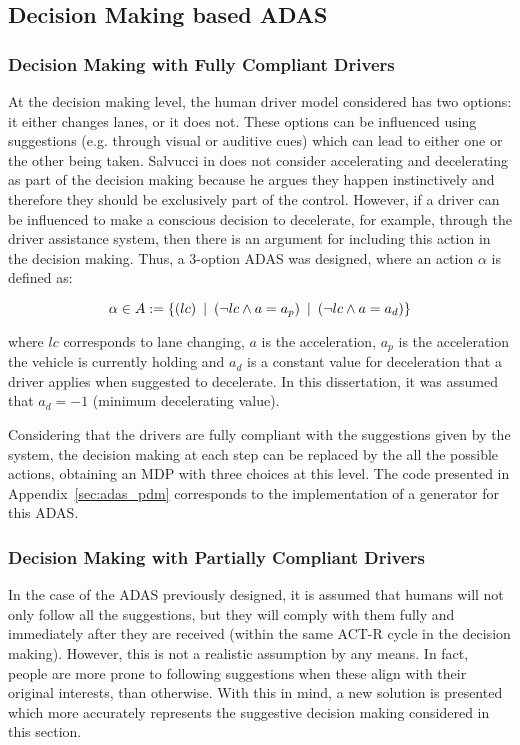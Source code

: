 \subsection{Decision Making based ADAS}

\subsubsection{Decision Making with Fully Compliant Drivers}

At the decision making level, the human driver model considered has two options: it either changes lanes, or it does not. These options can be influenced using suggestions (e.g. through visual or auditive cues) which can lead to either one or the other being taken. Salvucci in \cite{salvucci_1} does not consider accelerating and decelerating as part of the decision making because he argues they happen instinctively and therefore they should be exclusively part of the control. However, if a driver can be influenced to make a conscious decision to decelerate, for example, through the driver assistance system, then there is an argument for including this action in the decision making. Thus, a 3-option ADAS was designed, where an action $\alpha$ is defined as:

\begin{equation}
	\alpha \in A := \{(lc) \:\mid\: (\neg lc \wedge a = a_p) \:\mid\: (\neg lc \wedge a = a_d)\}
\end{equation}

where $lc$ corresponds to lane changing, $a$ is the acceleration, $a_p$ is the acceleration the vehicle is currently holding and $a_d$ is a constant value for deceleration that a driver applies when suggested to decelerate. In this dissertation, it was assumed that $a_d = -1$ (minimum decelerating value).

Considering that the drivers are fully compliant with the suggestions given by the system, the decision making at each step can be replaced by the all the possible actions, obtaining an MDP with three choices at this level. The code presented in Appendix~\ref{sec:adas_pdm} corresponds to the implementation of a generator for this ADAS.

\subsubsection{Decision Making with Partially Compliant Drivers}

In the case of the ADAS previously designed, it is assumed that humans will not only follow all the suggestions, but they will comply with them fully and immediately after they are received (within the same ACT-R cycle in the decision making). However, this is not a realistic assumption by any means. In fact, people are more prone to following suggestions when these align with their original interests, than otherwise. With this in mind, a new solution is presented which more accurately represents the suggestive decision making considered in this section.

